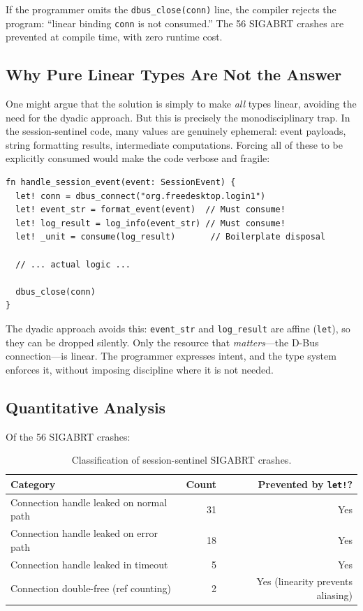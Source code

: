 \documentclass[11pt,a4paper]{article}
\begin{document}
If the programmer omits the \lstinline{dbus_close(conn)} line, the compiler
rejects the program: ``linear binding \lstinline{conn} is not consumed.'' The
56 SIGABRT crashes are prevented at compile time, with zero runtime cost.

\subsection{Why Pure Linear Types Are Not the Answer}

One might argue that the solution is simply to make \emph{all} types linear,
avoiding the need for the dyadic approach. But this is precisely the
monodisciplinary trap. In the session-sentinel code, many values are genuinely
ephemeral: event payloads, string formatting results, intermediate computations.
Forcing all of these to be explicitly consumed would make the code verbose and
fragile:

\begin{lstlisting}[language=Ephapax, caption={The purely-linear alternative: verbose and fragile.}]
fn handle_session_event(event: SessionEvent) {
  let! conn = dbus_connect("org.freedesktop.login1")
  let! event_str = format_event(event)  // Must consume!
  let! log_result = log_info(event_str) // Must consume!
  let! _unit = consume(log_result)       // Boilerplate disposal

  // ... actual logic ...

  dbus_close(conn)
}
\end{lstlisting}

The dyadic approach avoids this: \lstinline{event_str} and
\lstinline{log_result} are affine (\lstinline{let}), so they can be dropped
silently. Only the resource that \emph{matters}---the D-Bus connection---is
linear. The programmer expresses intent, and the type system enforces it,
without imposing discipline where it is not needed.

\subsection{Quantitative Analysis}

Of the 56 SIGABRT crashes:

\begin{table}[htbp]
\centering
\begin{tabular}{lrr}
\toprule
\textbf{Category} & \textbf{Count} & \textbf{Prevented by \texttt{let!}?} \\
\midrule
Connection handle leaked on normal path & 31 & Yes \\
Connection handle leaked on error path  & 18 & Yes \\
Connection handle leaked in timeout     & 5  & Yes \\
Connection double-free (ref counting)   & 2  & Yes (linearity prevents aliasing) \\
\bottomrule
\end{tabular}
\caption{Classification of session-sentinel SIGABRT crashes.}
\label{tab:crashes}
\end{table}
\end{document}

